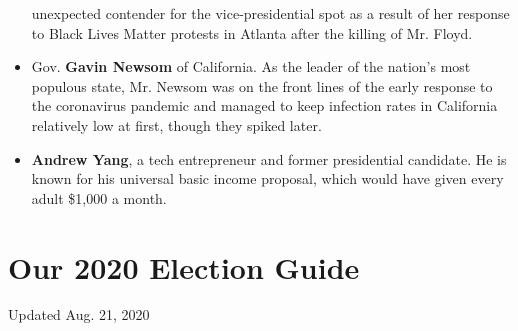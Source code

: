 \begin{itemize}
  unexpected contender for the vice-presidential spot as a result of her
  response to Black Lives Matter protests in Atlanta after the killing
  of Mr. Floyd.
\item
  Gov. \textbf{Gavin Newsom} of California. As the leader of the
  nation's most populous state, Mr. Newsom was on the front lines of the
  early response to the coronavirus pandemic and managed to keep
  infection rates in California relatively low at first, though they
  spiked later.
\item
  \textbf{Andrew Yang}, a tech entrepreneur and former presidential
  candidate. He is known for his universal basic income proposal, which
  would have given every adult \$1,000 a month.
\end{itemize}

\hypertarget{our-2020-election-guide}{%
\section{Our 2020 Election Guide}\label{our-2020-election-guide}}

Updated Aug. 21, 2020

